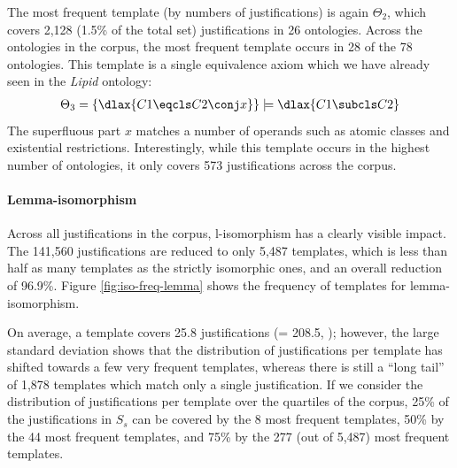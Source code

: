 The most frequent template (by numbers of justifications) is again $\Theta_{2}$, which covers 2,128 (1.5\% of the total set) justifications in 26 ontologies. Across the ontologies in the corpus, the most frequent template occurs in 28 of the 78 ontologies. This template is a single equivalence axiom which we have already seen in the \emph{Lipid} ontology:
\begin{align*}
\Theta_{3} = \{\dlax{C1 \eqcls C2 \conj x} \} \models \dlax{C1 \subcls C2}
\end{align*}
The superfluous part $x$ matches a number of operands such as atomic classes and existential restrictions. Interestingly, while this template occurs in the highest number of ontologies, it only covers 573 justifications across the corpus.


\paragraph{Lemma-isomorphism}

Across all justifications in the corpus, l-isomorphism has a clearly visible impact. The 141,560 justifications are reduced to only 5,487 templates, which is less than half as many templates as the strictly isomorphic ones, and an overall reduction of 96.9\%. Figure \ref{fig:iso-freq-lemma} shows the frequency of templates for lemma-isomorphism.

On average, a template covers 25.8 justifications (\sdev = 208.5, ); however, the large standard deviation shows that the distribution of justifications per template has shifted towards a few very frequent templates, whereas there is still a \enquote{long tail} of 1,878 templates which match only a single justification. If we consider the distribution of justifications per template over the quartiles of the corpus, 25\% of the justifications in $S_{s}$ can be covered by the 8 most frequent templates, 50\% by the 44 most frequent templates, and 75\% by the 277 (out of 5,487) most frequent templates.

